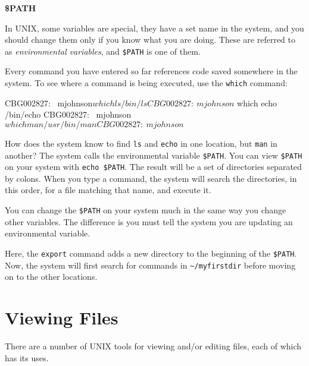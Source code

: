 \documentclass[11pt, oneside]{article}   	%
\begin{document}
\Large\textbf{\textemdash\$PATH}
\normalsize

In UNIX, some variables are special, they have a set name in the system, and you should change them only if you know what you are doing.
These are referred to as \emph{environmental variables}, and \verb+$PATH+ is one of them.

Every command you have entered so far references code saved somewhere in the system.
To see where a command is being executed, use the \verb+which+ command:

\begin{Terminal}[caption=Using which,label=which]
CBG002827:~ mjohnson$ which ls
/bin/ls
CBG002827:~ mjohnson$ which echo
/bin/echo
CBG002827:~ mjohnson$ which man
/usr/bin/man
CBG002827:~ mjohnson$ 
\end{Terminal}

How does the system know to find \verb+ls+ and \verb+echo+ in one location, but \verb+man+ in another?
The system calls the environmental variable \verb+$PATH+.
You can view \verb+$PATH+ on your system with \verb+echo $PATH+.
The result will be a set of directories separated by colons.
When you type a command, the system will search the directories, in this order, for a file matching that name, and execute it.

You can change the \verb+$PATH+ on your system much in the same way you change other variables.
The difference is you must tell the system you are updating an environmental variable.

Here, the \verb+export+ command adds a new directory to the beginning of the \verb+$PATH+.
Now, the system will first search for commands in \verb+~/myfirstdir+ before moving on to the other locations.


\section{Viewing Files}
There are a number of UNIX tools for viewing and/or editing files, each of which has its uses.
\end{document}
